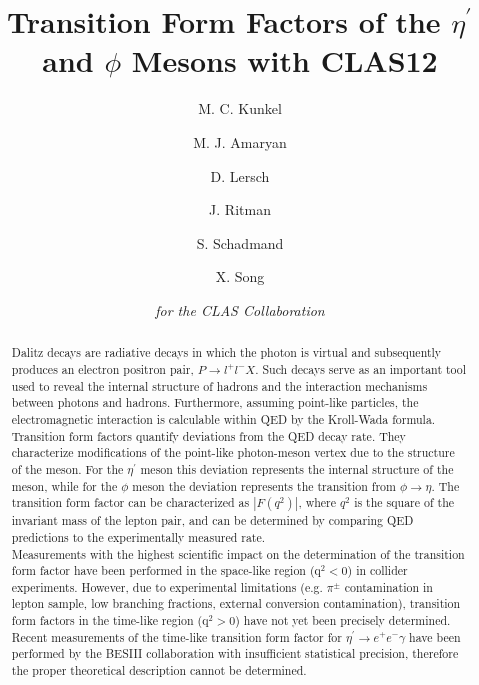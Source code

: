 \documentclass{aip-cp}
\def\etaP{\eta^{\prime}}
\begin{document}
\title{Transition Form Factors of the $\eta^{\prime}$ and $\phi$ Mesons with CLAS12}
\author[aff1]{M. C. Kunkel}
\author[aff2]{M. J. Amaryan}
\author[aff1]{D. Lersch}
\author[aff1]{J. Ritman}
\author[aff1]{S. Schadmand}
\author[aff1]{X. Song}
\author{\textit{for the CLAS Collaboration}}
\maketitle

\begin{abstract}
Dalitz decays are radiative decays in which the photon is virtual and subsequently produces an electron positron pair, $P\rightarrow l^+l^-X$. Such decays serve as an important tool used to reveal the internal structure of hadrons and the interaction mechanisms between photons and hadrons. Furthermore, assuming point-like particles, the electromagnetic interaction is calculable within QED by the Kroll-Wada formula. Transition form factors quantify deviations from the QED decay rate. They characterize modifications of the point-like photon-meson vertex due to the structure of the meson. For the $\etaP$ meson this deviation represents the internal structure of the meson, while for the $\phi$ meson the deviation represents the transition from $\phi \to \eta$. The transition form factor can be characterized as $\left| F(q^2)\right|$, where $q^2$ is the square of the invariant mass of the lepton pair, and can be determined by comparing QED predictions to the experimentally measured rate.
 \\ 
 \indent Measurements with the highest scientific impact on the determination of the transition form factor have been performed in the space-like region ($\mathrm{q}^2<0$) in collider experiments. However, due to experimental limitations (e.g. $\pi^{\pm}$ contamination in lepton sample, low branching fractions, external conversion contamination), transition form factors in the time-like region ($\mathrm{q}^2>0$) have not yet been precisely determined. Recent measurements of the time-like transition form factor for $\etaP \to e^+e^- \gamma$ have been performed by the BESIII collaboration with insufficient statistical precision, therefore the proper theoretical description cannot be determined. 
\\

\end{abstract}
\end{document}
